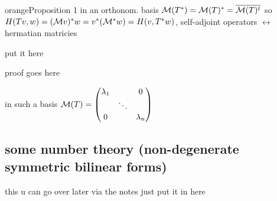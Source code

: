 \documentclass{article}
\begin{document}
\begin{mybox}{orange}{Proposition 1}
    in an orthonom. basis \( \mathcal{M} (T^*) = \mathcal{M} (T)^*=\overline{\mathcal{M}(T)^t}  \) so \( H(Tv,w)=(\mathcal{M} v )^*w = v^* (\mathcal{M}^* w)=H(v,T^*w) \), self-adjoint operators \( \leftrightarrow \) hermatian matricies 

\end{mybox}


\begin{definition}
  put it here 
\end{definition}

proof goes here

in such a basis \( \mathcal{M} (T) = \begin{pmatrix} \lambda_1 & \, & 0 \\ \, & \ddots& \, \\ 0 & \, & \lambda_n \end{pmatrix}  \)


\subsection{some number theory (non-degenerate symmetric bilinear forms)}

this u can go over later via the notes just put it in here
\end{document}
